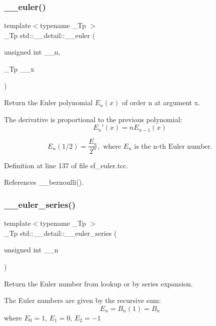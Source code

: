 \subsubsection{\texorpdfstring{\+\_\+\+\_\+euler()}{\_\_euler()}\hspace{0.1cm}{\footnotesize\ttfamily [2/2]}}
{\footnotesize\ttfamily template$<$typename \+\_\+\+Tp $>$ \\
\+\_\+\+Tp std\+::\+\_\+\+\_\+detail\+::\+\_\+\+\_\+euler (\begin{DoxyParamCaption}\item[{unsigned int}]{\+\_\+\+\_\+n,  }\item[{\+\_\+\+Tp}]{\+\_\+\+\_\+x }\end{DoxyParamCaption})}

Return the Euler polynomial $ E_n(x) $ of order n at argument x.

The derivative is proportional to the previous polynomial\+: \[ E_n'(x) = n E_{n-1}(x) \]

\[ E_n(1/2) = \frac{E_n}{2^n}, \mbox{ where } E_n \mbox{ is the n-th Euler number.} \] 

Definition at line 137 of file sf\+\_\+euler.\+tcc.



References \+\_\+\+\_\+bernoulli().

\mbox{\label{namespacestd_1_1____detail_a2e3eb67dee4d0b5c96824a4e8e9c227e}} 
\subsubsection{\texorpdfstring{\+\_\+\+\_\+euler\+\_\+series()}{\_\_euler\_series()}}
{\footnotesize\ttfamily template$<$typename \+\_\+\+Tp $>$ \\
\+\_\+\+Tp std\+::\+\_\+\+\_\+detail\+::\+\_\+\+\_\+euler\+\_\+series (\begin{DoxyParamCaption}\item[{unsigned int}]{\+\_\+\+\_\+n }\end{DoxyParamCaption})}

Return the Euler number from lookup or by series expansion.

The Euler numbers are given by the recursive sum\+: \[ E_n = B_n(1) = B_n \] where $ E_0 = 1 $, $ E_1 = 0 $, $ E_2 = -1 $

